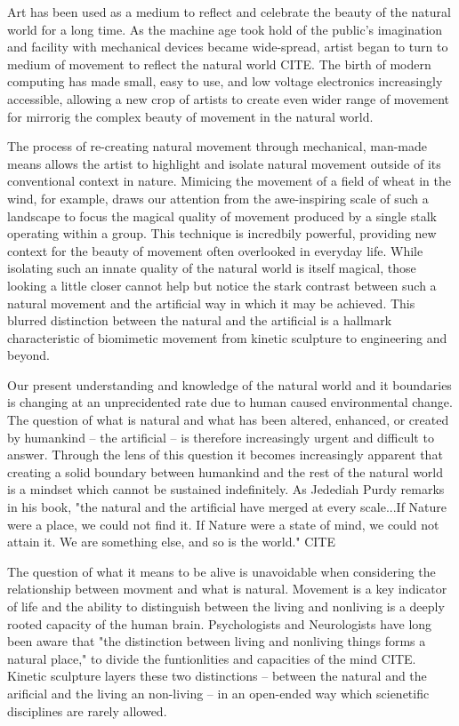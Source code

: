 \documentclass[letterpaper]{article}
\begin{document}

Art has been used as a medium to reflect and celebrate the beauty of the natural world for a long time. As the machine age took hold of the public's imagination and facility with mechanical devices became wide-spread, artist began to turn to medium of movement to reflect the natural world CITE. The birth of modern computing has made small, easy to use, and low voltage electronics increasingly accessible, allowing a new crop of artists to create even wider range of movement for mirrorig the complex beauty of movement in the natural world. 

The process of re-creating natural movement through mechanical, man-made means allows the artist to highlight and isolate natural movement outside of its conventional context in nature. Mimicing the movement of a field of wheat in the wind, for example, draws our attention from the awe-inspiring scale of such a landscape to focus the magical quality of movement produced by a single stalk operating within a group. This technique is incredbily powerful, providing new context for the beauty of movement often overlooked in everyday life. While isolating such an innate quality of the natural world is itself magical, those looking a little closer cannot help but notice the stark contrast between such a natural movement and the artificial way in which it may be achieved. This blurred distinction between the natural and the artificial is a hallmark characteristic of biomimetic movement from kinetic sculpture to engineering and beyond.

Our present understanding and knowledge of the natural world and it boundaries is changing at an unprecidented rate due to human caused environmental change. The question of what is natural and what has been altered, enhanced, or created by humankind -- the artificial -- is therefore increasingly urgent and difficult to answer. Through the lens of this question it becomes increasingly apparent that creating a solid boundary between humankind and the rest of the natural world is a mindset which cannot be sustained indefinitely. As Jedediah Purdy remarks in his book, "the natural and the artificial have merged at every scale...If Nature were a place, we could not find it. If Nature were a state of mind, we could not attain it. We are something else, and so is the world." CITE

The question of what it means to be alive is unavoidable when considering the relationship between movment and what is natural. Movement is a key indicator of life and the ability to distinguish between the living and nonliving is a deeply rooted capacity of the human brain. Psychologists and Neurologists have long been aware that "the distinction between living and nonliving things forms a natural place," to divide the funtionlities and capacities of the mind CITE. Kinetic sculpture layers these two distinctions -- between the natural and the arificial and the living an non-living -- in an open-ended way which scienetific disciplines are rarely allowed.   
\end{document}
